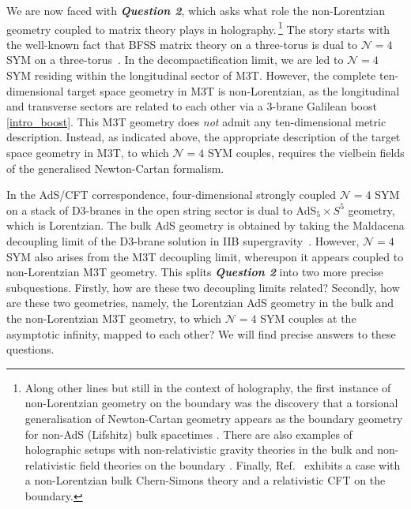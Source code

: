 \documentclass[11pt]{article}
\newcommand{\CN}{\mathcal{N}}
\renewcommand{\emph}[1]{\textit{#1}}
\begin{document}
We are now faced with \emph{\textbf{Question 2}}, which asks what role the non-Lorentzian geometry coupled to matrix theory plays in holography.\,\footnote{Along other lines but still in the context of holography, the first instance of non-Lorentzian geometry on the boundary was the discovery that a torsional generalisation of Newton-Cartan geometry appears as the boundary geometry for non-AdS (Lifshitz) bulk spacetimes \cite{Christensen:2013lma,Christensen:2013rfa}. 
There are also examples of  holographic setups with non-relativistic gravity theories in the bulk and non-relativistic field theories on the boundary \cite{Kachru:2008yh,Griffin:2012qx,Hofman:2014loa,Hartong:2016yrf}. Finally, Ref.~\cite{Hartong:2017bwq} exhibits a case with a non-Lorentzian bulk Chern-Simons theory and a relativistic CFT on the boundary.} 
The story starts with the well-known fact that BFSS matrix theory on a three-torus is dual to $\CN = 4$ SYM on a three-torus~\cite{Taylor:2001vb}. In the decompactification limit, we are led to $\CN = 4$ SYM residing within the longitudinal sector of M3T. However, the complete ten-dimensional target space geometry in M3T is non-Lorentzian, as the longitudinal and transverse sectors are related to each other via a 3-brane Galilean boost \eqref{intro_boost}. This M3T geometry 
does \emph{not} admit any ten-dimensional metric description. Instead, as indicated above, the appropriate description of the target space geometry in M3T, to which $\CN = 4$ SYM couples, requires the vielbein fields of the generalised Newton-Cartan formalism.

In the AdS/CFT correspondence, four-dimensional strongly coupled $\CN = 4$ SYM on a stack of D3-branes in the open string sector is dual to AdS${}_5 \times S^5$ geometry, which is Lorentzian. 
The bulk AdS geometry is obtained by taking the Maldacena decoupling limit of the D3-brane solution in IIB supergravity~\cite{Maldacena:1997re}. 
However, $\CN = 4$ SYM also arises from the M3T decoupling limit, whereupon it appears coupled to non-Lorentzian M3T geometry.
This splits \emph{\textbf{Question 2}} into two more precise subquestions.
Firstly, how are these two decoupling limits related?
Secondly, how are these two geometries, namely, the Lorentzian AdS geometry in the bulk and the non-Lorentzian M3T geometry, to which $\mathcal{N} = 4$ SYM couples at the asymptotic infinity, mapped to each other? We will find precise answers to these questions.

\vspace{3mm}
\end{document}
